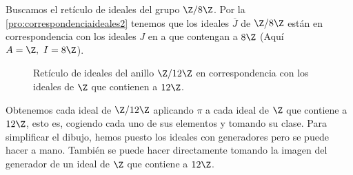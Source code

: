 \begin{ej}
	Buscamos el retículo de ideales del grupo $\Z/8\Z$. Por la \autoref{pro:correspondenciaideales2} tenemos que los ideales $\overline{J}$ de $\Z/8\Z$ están en correspondencia con los ideales $J$ en a que contengan a $8\Z$ (Aquí $A = \Z,\ I = 8\Z$).
	
	\begin{figure}[h]
		\centering
		\caption{Retículo de ideales del anillo $\Z/12\Z$ en correspondencia con los ideales de $\Z$ que contienen a $12\Z$.}
	\end{figure}

	Obtenemos cada ideal de $\Z/12\Z$ aplicando $\pi$ a cada ideal de $\Z$ que contiene a $12\Z$, esto es, cogiendo cada uno de sus elementos y tomando su clase. Para simplificar el dibujo, hemos puesto los ideales con generadores pero se puede hacer a mano. También se puede hacer directamente tomando la imagen del generador de un ideal de $\Z$ que contiene a $12\Z$.
\end{ej}


